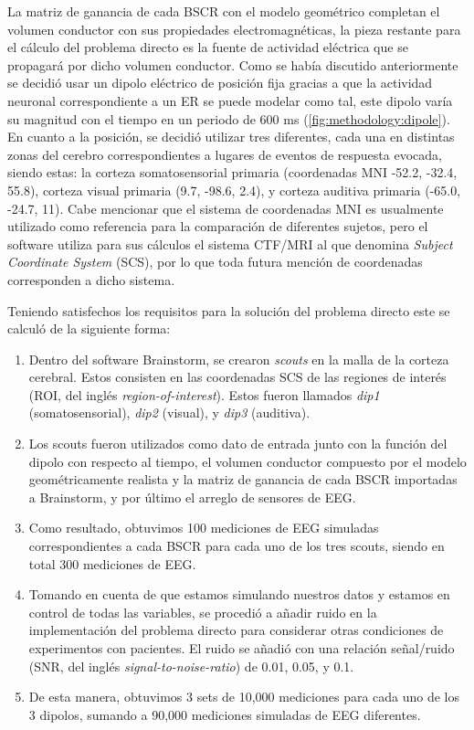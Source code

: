 La matriz de ganancia de cada BSCR con el modelo geométrico completan el volumen conductor con sus propiedades electromagnéticas, la pieza restante para el cálculo del problema directo es la fuente de actividad eléctrica que se propagará por dicho volumen conductor. Como se había discutido anteriormente se decidió usar un dipolo eléctrico de posición fija gracias a que la actividad neuronal correspondiente a un ER se puede modelar como tal, este dipolo varía su magnitud con el tiempo en un periodo de 600 ms (\cref{fig:methodology:dipole}). En cuanto a la posición, se decidió utilizar tres diferentes, cada una en distintas zonas del cerebro correspondientes a lugares de eventos de respuesta evocada, siendo estas: la corteza somatosensorial primaria (coordenadas MNI -52.2, -32.4, 55.8), corteza visual primaria (9.7, -98.6, 2.4), y corteza auditiva primaria (-65.0, -24.7, 11). Cabe mencionar que el sistema de coordenadas MNI es usualmente utilizado como referencia para la comparación de diferentes sujetos, pero el software utiliza para sus cálculos el sistema CTF/MRI al que denomina \emph{Subject Coordinate System} (SCS), por lo que toda futura mención de coordenadas corresponden a dicho sistema.

Teniendo satisfechos los requisitos para la solución del problema directo este se calculó de la siguiente forma:

\begin{enumerate}
	\item Dentro del software Brainstorm, se crearon \emph{scouts} en la malla de la corteza cerebral. Estos consisten en las coordenadas SCS de las regiones de interés (ROI, del inglés \emph{region-of-interest}). Estos fueron llamados \emph{dip1} (somatosensorial), \emph{dip2} (visual), y \emph{dip3} (auditiva).
	\item Los scouts fueron utilizados como dato de entrada junto con la función del dipolo con respecto al tiempo, el volumen conductor compuesto por el modelo geométricamente realista y la matriz de ganancia de cada BSCR importadas a Brainstorm, y por último el arreglo de sensores de EEG.
	\item Como resultado, obtuvimos 100 mediciones de EEG simuladas correspondientes a cada BSCR para cada uno de los tres scouts, siendo en total 300 mediciones de EEG.
	\item Tomando en cuenta de que estamos simulando nuestros datos y estamos en control de todas las variables, se procedió a añadir ruido en la implementación del problema directo para considerar otras condiciones de experimentos con pacientes. El ruido se añadió con una relación señal/ruido (SNR, del inglés \emph{signal-to-noise-ratio}) de 0.01, 0.05, y 0.1.
	\item De esta manera, obtuvimos 3 sets de 10,000 mediciones para cada uno de los 3 dipolos, sumando a 90,000 mediciones simuladas de EEG diferentes.
\end{enumerate}

